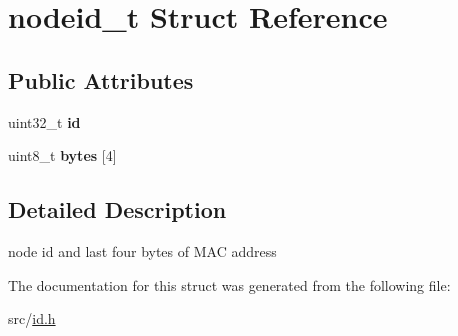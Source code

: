 \hypertarget{unionnodeid__t}{\section{nodeid\+\_\+t Struct Reference}
\label{unionnodeid__t}
}
\subsection*{Public Attributes}
\begin{DoxyCompactItemize}
\item 
\hypertarget{unionnodeid__t_a1e946677ad39dfeb9944ffce81432ba5}{uint32\+\_\+t {\bfseries id}}\label{unionnodeid__t_a1e946677ad39dfeb9944ffce81432ba5}

\item 
\hypertarget{unionnodeid__t_aaffc442232e5775496b5e322a9653a3b}{uint8\+\_\+t {\bfseries bytes} \mbox{[}4\mbox{]}}\label{unionnodeid__t_aaffc442232e5775496b5e322a9653a3b}

\end{DoxyCompactItemize}


\subsection{Detailed Description}
node id and last four bytes of M\+A\+C address 

The documentation for this struct was generated from the following file\+:\begin{DoxyCompactItemize}
\item 
src/\hyperlink{id_8h}{id.\+h}\end{DoxyCompactItemize}
